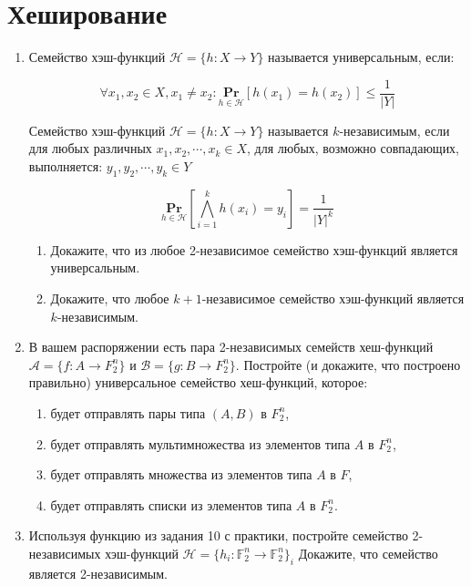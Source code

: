 \section*{Хеширование}
\begin{enumerate}
	\item Семейство хэш-функций $\mathcal{H} = \{h : X \rightarrow Y \}$ называется универсальным, если:
	
	\begin{equation*}
	\forall x_1, x_2 \in X, x_1 \neq x_2 : \underset{h \in \mathcal{H}}{\mathbf{Pr}} \left[h(x_1) = h(x_2)\right] 
	\leqslant \frac{1}{|Y|}
	\end{equation*}
	
	Семейство хэш-функций $\mathcal{H} = \{h : X \rightarrow Y \}$ называется $k$-независимым, если для любых 
	различных $x_1, x_2, \cdots , x_k \in X$, для любых, возможно совпадающих, выполняется: $y_1, y_2, \cdots, 
	y_k \in Y$
	
	\begin{equation*}
	 \underset{h \in \mathcal{H}}{\mathbf{Pr}} \left[\bigwedge\limits_{i = 1}^{k} h(x_i) = y_i\right] = 
	 \frac{1}{|Y|^k}
	\end{equation*}
		
	\begin{enumerate}
		\item Докажите, что из любое 2-независимое семейство хэш-функций является универсальным.
		\item Докажите, что любое $k + 1$-независимое семейство хэш-функций является $k$-независимым.
	\end{enumerate}
	
	
	\item В вашем распоряжении есть пара 2-независимых семейств хеш-функций $\mathcal{A} = \{f : A \rightarrow 
	F_2^n \}$ и $\mathcal{B} = \{g : B \rightarrow F_2^n \}$. Постройте (и докажите, что построено правильно) 
	универсальное семейство хеш-функций, которое:
	\begin{enumerate}
		\item будет отправлять пары типа $(A, B)$ в $F_2^n$,
		\item будет отправлять мультимножества из элементов типа $A$ в $F_2^n$,
		\item будет отправлять множества из элементов типа $A$ в $F$,
		\item будет отправлять списки из элементов типа $A$ в $F_2^n$.
	\end{enumerate}
	
	\item Используя функцию из задания 10 с практики, постройте семейство 2-независимых хэш-функций $\mathcal{H} 
	= \{h_i: \mathbb{F}^n_2 \rightarrow \mathbb{F}^n_2\}_i$ Докажите, что семейство является 2-независимым.
		

\end{enumerate}
